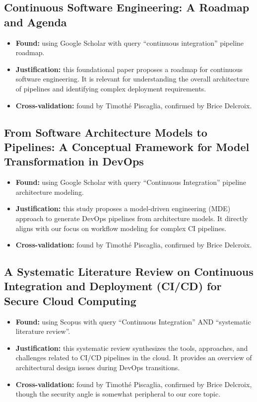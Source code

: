 \documentclass[a4paper,11pt,oneside]{article}
\begin{document}
\subsection{Continuous Software Engineering: A Roadmap and Agenda \cite{Fitzgerald2017}}
%
\begin{itemize}
    \item \textbf{Found:} using Google Scholar with query ``continuous integration'' pipeline roadmap.
    \item \textbf{Justification:} this foundational paper proposes a roadmap for continuous software engineering. It is relevant for understanding the overall architecture of pipelines and identifying complex deployment requirements.
    \item \textbf{Cross-validation:} found by Timoth\'{e} Piscaglia, confirmed by Brice Delcroix.
\end{itemize}

\subsection{From Software Architecture Models to Pipelines: A Conceptual Framework for Model Transformation in DevOps \cite{Karlovs2025}}
%
\begin{itemize}
    \item \textbf{Found:} using Google Scholar with query ``Continuous Integration'' pipeline architecture modeling.
    \item \textbf{Justification:} this study proposes a model-driven engineering (MDE) approach to generate DevOps pipelines from architecture models. It directly aligns with our focus on workflow modeling for complex CI pipelines.
    \item \textbf{Cross-validation:} found by Timoth\'{e} Piscaglia, confirmed by Brice Delcroix.
\end{itemize}

\subsection{A Systematic Literature Review on Continuous Integration and Deployment (CI/CD) for Secure Cloud Computing \cite{Saleh2024}}
%
\begin{itemize}
    \item \textbf{Found:} using Scopus with query ``Continuous Integration'' AND ``systematic literature review''.
    \item \textbf{Justification:} this systematic review synthesizes the tools, approaches, and challenges related to CI/CD pipelines in the cloud. It provides an overview of architectural design issues during DevOps transitions.
    \item \textbf{Cross-validation:} found by Timoth\'{e} Piscaglia, confirmed by Brice Delcroix, though the security angle is somewhat peripheral to our core topic.
\end{itemize}
\end{document}
